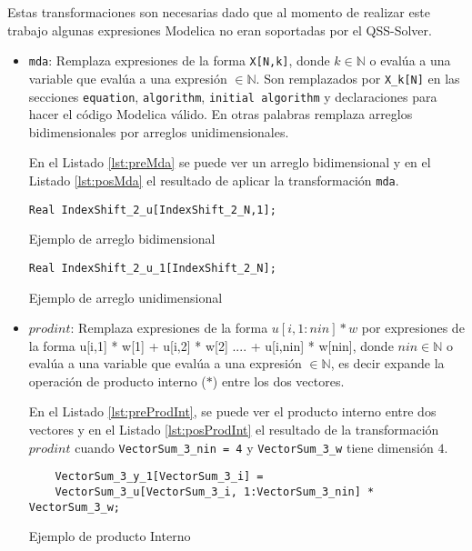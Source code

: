 	Estas transformaciones son necesarias dado que al momento de realizar este trabajo algunas expresiones Modelica no eran soportadas por el QSS-Solver.
	 
	  \begin{itemize}
		\item  \texttt{mda}: Remplaza expresiones de la forma \texttt{X[N,k]}, donde $k \in \mathbb{N}$ o evalúa a una variable que evalúa a una expresión 
			$\in \mathbb{N}$. Son remplazados por \texttt{X\_k[N]} en las secciones \texttt{equation}, \texttt{algorithm}, \texttt{initial algorithm} y 
		declaraciones para hacer el código Modelica válido. En otras palabras remplaza arreglos bidimensionales por arreglos unidimensionales.
	
		En el Listado \ref{lst:preMda} se puede ver un arreglo bidimensional y en el Listado \ref{lst:posMda} el resultado de aplicar la transformación \texttt{mda}.

\begin{listing}[hcp]
\centering
\begin{verbatim}
Real IndexShift_2_u[IndexShift_2_N,1];
\end{verbatim}
\caption{Ejemplo de arreglo bidimensional}\label{lst:preMda}
\end{listing}

\begin{listing}[hc]
\centering
\begin{verbatim}
Real IndexShift_2_u_1[IndexShift_2_N];
\end{verbatim}
\caption{Ejemplo de arreglo unidimensional}\label{lst:posMda}
\end{listing}

		\item $prodint$: Remplaza expresiones de la forma $u[i, 1:nin] * w$ por expresiones de la forma 
			u[i,1] * w[1] + u[i,2] * w[2] .... + u[i,nin] * w[nin], donde $nin \in \mathbb{N}$ o evalúa a una variable que evalúa a una 
			expresión $\in \mathbb{N}$, es decir expande la operación de producto interno ($*$) entre los dos vectores.

		En el Listado \ref{lst:preProdInt}, se puede ver el producto interno entre dos vectores y en el Listado \ref{lst:posProdInt} el resultado de 
	la transformación $prodint$ cuando \texttt{VectorSum\_3\_nin = 4}  y \texttt{VectorSum\_3\_w} tiene dimensión $4$.

\begin{listing}[H]
\begin{verbatim}
    VectorSum_3_y_1[VectorSum_3_i] = 
	VectorSum_3_u[VectorSum_3_i, 1:VectorSum_3_nin] * VectorSum_3_w;
\end{verbatim}
\caption{Ejemplo de producto Interno}\label{lst:preProdInt}
\end{listing}


\end{itemize}
